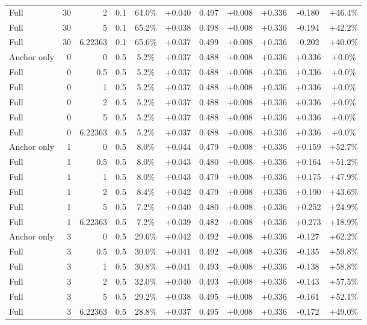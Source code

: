 \begin{table}[htbp]
\begin{tabular}{lrrrccccccc}
Full & 30 & 2 & 0.1 & 64.0\% & +0.040 & 0.497 & +0.008 & +0.336 & -0.180 & +46.4\% \\
Full & 30 & 5 & 0.1 & 65.2\% & +0.038 & 0.498 & +0.008 & +0.336 & -0.194 & +42.2\% \\
Full & 30 & 6.22363 & 0.1 & 65.6\% & +0.037 & 0.499 & +0.008 & +0.336 & -0.202 & +40.0\% \\
Anchor only & 0 & 0 & 0.5 & 5.2\% & +0.037 & 0.488 & +0.008 & +0.336 & +0.336 & +0.0\% \\
Full & 0 & 0.5 & 0.5 & 5.2\% & +0.037 & 0.488 & +0.008 & +0.336 & +0.336 & +0.0\% \\
Full & 0 & 1 & 0.5 & 5.2\% & +0.037 & 0.488 & +0.008 & +0.336 & +0.336 & +0.0\% \\
Full & 0 & 2 & 0.5 & 5.2\% & +0.037 & 0.488 & +0.008 & +0.336 & +0.336 & +0.0\% \\
Full & 0 & 5 & 0.5 & 5.2\% & +0.037 & 0.488 & +0.008 & +0.336 & +0.336 & +0.0\% \\
Full & 0 & 6.22363 & 0.5 & 5.2\% & +0.037 & 0.488 & +0.008 & +0.336 & +0.336 & +0.0\% \\
Anchor only & 1 & 0 & 0.5 & 8.0\% & +0.044 & 0.479 & +0.008 & +0.336 & +0.159 & +52.7\% \\
Full & 1 & 0.5 & 0.5 & 8.0\% & +0.043 & 0.480 & +0.008 & +0.336 & +0.164 & +51.2\% \\
Full & 1 & 1 & 0.5 & 8.0\% & +0.043 & 0.479 & +0.008 & +0.336 & +0.175 & +47.9\% \\
Full & 1 & 2 & 0.5 & 8.4\% & +0.042 & 0.479 & +0.008 & +0.336 & +0.190 & +43.6\% \\
Full & 1 & 5 & 0.5 & 7.2\% & +0.040 & 0.480 & +0.008 & +0.336 & +0.252 & +24.9\% \\
Full & 1 & 6.22363 & 0.5 & 7.2\% & +0.039 & 0.482 & +0.008 & +0.336 & +0.273 & +18.9\% \\
Anchor only & 3 & 0 & 0.5 & 29.6\% & +0.042 & 0.492 & +0.008 & +0.336 & -0.127 & +62.2\% \\
Full & 3 & 0.5 & 0.5 & 30.0\% & +0.041 & 0.492 & +0.008 & +0.336 & -0.135 & +59.8\% \\
Full & 3 & 1 & 0.5 & 30.8\% & +0.041 & 0.493 & +0.008 & +0.336 & -0.138 & +58.8\% \\
Full & 3 & 2 & 0.5 & 32.0\% & +0.040 & 0.493 & +0.008 & +0.336 & -0.143 & +57.5\% \\
Full & 3 & 5 & 0.5 & 29.2\% & +0.038 & 0.495 & +0.008 & +0.336 & -0.161 & +52.1\% \\
Full & 3 & 6.22363 & 0.5 & 28.8\% & +0.037 & 0.495 & +0.008 & +0.336 & -0.172 & +49.0\% \\

\end{tabular}
\end{table}
